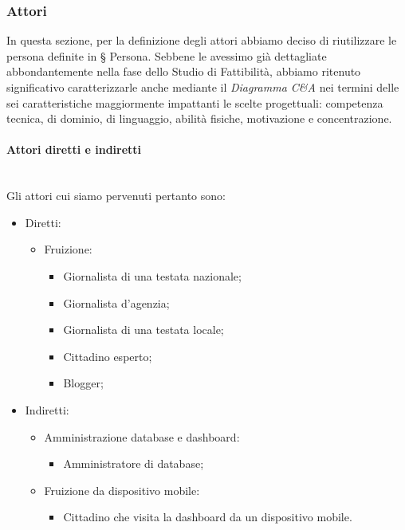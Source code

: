 \subsubsection{Attori}
In questa sezione, per la definizione degli attori abbiamo deciso di riutilizzare le persona definite in § Persona.
Sebbene le avessimo già dettagliate abbondantemente nella fase dello Studio di Fattibilità, abbiamo ritenuto significativo caratterizzarle anche mediante il \textit{Diagramma C\&A} nei termini delle sei caratteristiche maggiormente impattanti le scelte progettuali: competenza tecnica, di dominio, di linguaggio, abilità fisiche, motivazione e concentrazione.

\noindent
\paragraph{Attori diretti e indiretti}\mbox{}\\
Gli attori cui siamo pervenuti pertanto sono:
\begin{itemize}
    \item Diretti:
    \begin{itemize}
        \item Fruizione:
        \begin{itemize}
            \item Giornalista di una testata nazionale;
            \item Giornalista d'agenzia;
            \item Giornalista di una testata locale;
            \item Cittadino esperto;
            \item Blogger;
        \end{itemize}
    \end{itemize}
    \item Indiretti:
    \begin{itemize}
        \item Amministrazione database e dashboard:
        \begin{itemize}
            \item Amministratore di database;
        \end{itemize}
        \item Fruizione da dispositivo mobile:
        \begin{itemize}
            \item Cittadino che visita la dashboard da un dispositivo mobile.
        \end{itemize}
    \end{itemize}
\end{itemize}

